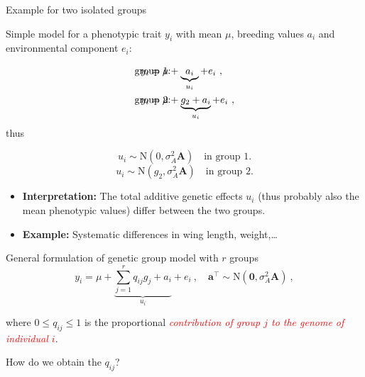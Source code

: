 \documentclass[10pt,ignorenonframetext,]{beamer}
\begin{document}
\begin{frame}

\begin{block}{Example for two isolated groups}

\vspace{3mm}

Simple model for a phenotypic trait \(y_i\) with mean \(\mu\), breeding
values \(a_i\) and environmental component \(e_i\): \vspace{-3mm}

\begin{align*} 
&\text{group 1:} \hspace{-14mm}  & y_i &= \mu +    \underbrace{a_i}_{u_i} +  e_i \ ,\\
&\text{group 2:}  \hspace{-14mm} & y_i &= \mu +  \underbrace{g_2 + a_i}_{u_i} +   e_i \ , 
\end{align*} \vspace{-3mm} thus

\[ u_i \sim \text{N}(0,\sigma_A^2 \mathbf{A})  \quad   \text{in group 1}. \]
\[ u_i \sim \text{N}(g_2,\sigma_A^2 \mathbf{A}) \quad     \text{in group 2}.\]
\vspace{3mm}

\begin{itemize}
\item
  \textbf{Interpretation:} The total additive genetic effects \(u_i\)
  (thus probably also the mean phenotypic values) differ between the two
  groups.
\item
  \textbf{Example:} Systematic differences in wing length,
  weight,\ldots{}
\end{itemize}

\end{block}

\end{frame}

\begin{frame}

General formulation of genetic group model with \(r\) groups \[
 y_i  = \mu + \underbrace{\sum_{j=1}^r q_{ij}g_j +  a_i}_{u_i} + e_i  \ , \quad \mathbf{a}^\top \sim \text{N}(\mathbf{0},\sigma_A^2\mathbf{A}) \ ,
\]

where \(0\leq q_{ij} \leq 1\) is the proportional
\emph{\textcolor{red}{contribution of group $j$ to the genome of individual $i$}}.

\vspace{3mm}
\vspace{3mm}

How do we obtain the \(q_{ij}\)?

\end{frame}
\end{document}
